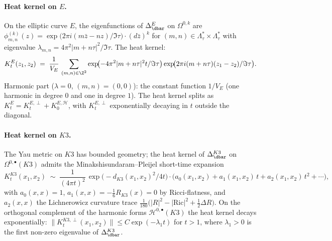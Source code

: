 \paragraph{Heat kernel on $E$.}
On the elliptic curve $E$, the eigenfunctions of $\Delta_{\dbar}^E$ on
$\Omega^{0, k}$ are
$\phi_{m, n}^{(k)}(z) = \exp\!\bigl(2 \pi i (m \bar z - n z)/\Im\tau\bigr) \cdot (d \bar z)^k$
for $(m, n) \in \Lambda_\tau^* \times \Lambda_\tau^*$ with eigenvalue
$\lambda_{m, n} = 4 \pi^2 |m + n \tau|^2 / \Im\tau$. The heat kernel:
\begin{equation}
\label{eq:heat-kernel-E-explicit}
 K_t^E(z_1, z_2) \;=\; \frac{1}{V_E}\,
 \sum_{(m, n) \in \Z^2} \exp\!\bigl(-4 \pi^2 |m + n\tau|^2 t / \Im\tau\bigr)
 \exp\!\bigl(2 \pi i (m + n\tau)(z_1 - z_2) / \Im\tau\bigr).
\end{equation}
Harmonic part ($\lambda = 0$, $(m, n) = (0, 0)$): the constant function
$1/V_E$ (one harmonic in degree $0$ and one in degree $1$). The
heat kernel splits as $K_t^E = K_t^{E, \perp} + K_0^{E, \mathcal{H}}$,
with $K_t^{E, \perp}$ exponentially decaying in $t$ outside the diagonal.

\paragraph{Heat kernel on $K3$.}
The Yau metric on $K3$ has bounded geometry; the heat kernel of
$\Delta_{\dbar}^{K3}$ on $\Omega^{0, \bullet}(K3)$ admits the
Minakshisundaram--Pleijel short-time expansion
\begin{equation}
\label{eq:k3-heat-kernel-short-time}
 K_t^{K3}(x_1, x_2) \;\sim\; \frac{1}{(4 \pi t)^2}\, \exp\!\bigl(-d_{K3}(x_1, x_2)^2 / 4 t\bigr) \cdot \bigl(a_0(x_1, x_2) + a_1(x_1, x_2) \, t + a_2(x_1, x_2)\, t^2 + \cdots\bigr),
\end{equation}
with $a_0(x, x) = 1$, $a_1(x, x) = -\tfrac{1}{6} R_{K3}(x) = 0$ by Ricci-flatness,
and $a_2(x, x)$ the Lichnerowicz curvature trace
$\tfrac{1}{180} \bigl(|R|^2 - |\mathrm{Ric}|^2 + \tfrac{1}{2}\Delta R\bigr)$.
On the orthogonal complement of the harmonic forms $\mathcal{H}^{0, \bullet}(K3)$
the heat kernel decays exponentially: $\|K_t^{K3, \perp}(x_1, x_2)\| \leq C \exp(-\lambda_1 t)$
for $t > 1$, where $\lambda_1 > 0$ is the first non-zero eigenvalue of $\Delta_{\dbar}^{K3}$.


